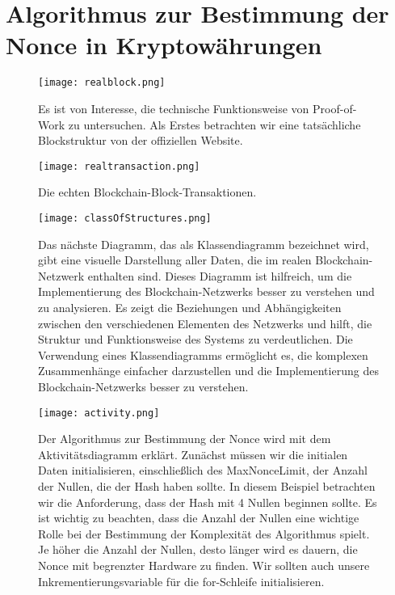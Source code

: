 \documentclass[ngerman]{scrreprt}
\begin{document}
\chapter[Praktische Anwendung der Proof-Of-Work-Methode]{Algorithmus zur Bestimmung der Nonce in Kryptowährungen}
\begin{figure}[H]
	\texttt{[image: realblock.png]}
	\caption{Es ist von Interesse, die technische Funktionsweise von Proof-of-Work zu untersuchen. Als Erstes betrachten wir eine tatsächliche Blockstruktur von der offiziellen Website.}
\end{figure}
\begin{figure}[H]
	\texttt{[image: realtransaction.png]}
	\caption{Die echten Blockchain-Block-Transaktionen.}
	
\end{figure}
\newpage
\begin{figure}[H]
	\centering
	\texttt{[image: classOfStructures.png]}
	\caption{Das nächste Diagramm, das als Klassendiagramm bezeichnet wird, gibt eine visuelle Darstellung aller Daten, die im realen Blockchain-Netzwerk enthalten sind. Dieses Diagramm ist hilfreich, um die Implementierung des Blockchain-Netzwerks besser zu verstehen und zu analysieren. Es zeigt die Beziehungen und Abhängigkeiten zwischen den verschiedenen Elementen des Netzwerks und hilft, die Struktur und Funktionsweise des Systems zu verdeutlichen. Die Verwendung eines Klassendiagramms ermöglicht es, die komplexen Zusammenhänge einfacher darzustellen und die Implementierung des Blockchain-Netzwerks besser zu verstehen.}
\end{figure}
\newpage
\begin{figure}[H]
	\centering
	\texttt{[image: activity.png]}
	\caption{Der Algorithmus zur Bestimmung der Nonce wird mit dem Aktivitätsdiagramm erklärt. Zunächst müssen wir die initialen Daten initialisieren, einschließlich des MaxNonceLimit, der Anzahl der Nullen, die der Hash haben sollte. In diesem Beispiel betrachten wir die Anforderung, dass der Hash mit 4 Nullen beginnen sollte. Es ist wichtig zu beachten, dass die Anzahl der Nullen eine wichtige Rolle bei der Bestimmung der Komplexität des Algorithmus spielt. Je höher die Anzahl der Nullen, desto länger wird es dauern, die Nonce mit begrenzter Hardware zu finden. Wir sollten auch unsere Inkrementierungsvariable für die for-Schleife initialisieren.}
\end{figure}
\end{document}
